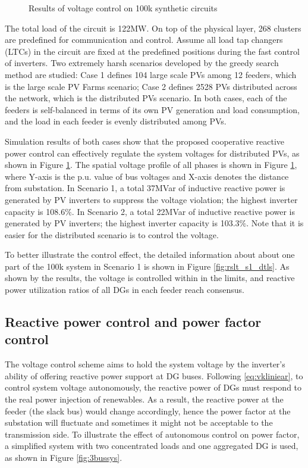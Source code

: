 \documentclass{article}
\begin{document}
\begin{figure}
{        \label{fig:rslt_s1_dtls}
}
    \caption{Results of voltage control on 100k synthetic circuits}
    \label{fig:C1_ckts_rslt}
\end{figure}
The total load of the circuit is 122MW. On top of the physical layer, 268 clusters are predefined for communication and control. Assume all load tap changers (LTCs) in the circuit are fixed at the predefined positions during the fast control of inverters. Two extremely harsh scenarios developed by the greedy search method \cite{rathbun2018impact} are studied: Case 1 defines 104 large scale PVs among 12 feeders, which is the large scale PV Farms scenario; Case 2 defines 2528 PVs distributed across the network, which is the distributed PVs scenario. In both cases, each of the feeders is self-balanced in terms of its own PV generation and load consumption, and the load in each feeder is evenly distributed among PVs.

Simulation results of both cases show that the proposed cooperative reactive power control can effectively regulate the system voltages for distributed PVs, as shown in Figure \ref{fig:C1_ckts_rslt}. The spatial voltage profile of all phases is shown in Figure \ref{fig:C1_ckts_rslt}, where Y-axis is the p.u. value of bus voltages and X-axis denotes the distance from substation. In Scenario 1, a total 37MVar of inductive reactive power is generated by PV inverters to suppress the voltage violation; the highest inverter capacity is 108.6$\%$. In Scenario 2, a total 22MVar of inductive reactive power is generated by PV inverters; the highest inverter capacity is 103.3$\%$. Note that it is easier for the distributed scenario is to control the voltage.

To better illustrate the control effect, the detailed information about about one part of the 100k system in Scenario 1 is shown in Figure \ref{fig:rslt_s1_dtls}. As shown by the results, the voltage is controlled within in the limits, and reactive power utilization ratios of all DGs in each feeder reach consensus.

\subsection{Reactive power control and power factor control}
The voltage control scheme aims to hold the system voltage by the inverter's ability of offering reactive power support at DG buses.
Following \eqref{eq:vkliniear}, to control system voltage autonomously, the reactive power of DGs must respond to the real power injection of renewables. As a result, the reactive power at the feeder (the slack bus) would change accordingly, hence the power factor at the substation will fluctuate and sometimes it might not be acceptable to the transmission side. To illustrate the effect of autonomous control on power factor, a simplified system with two concentrated loads and one aggregated DG is used, as shown in Figure \ref{fig:3bussys}.
\end{document}
